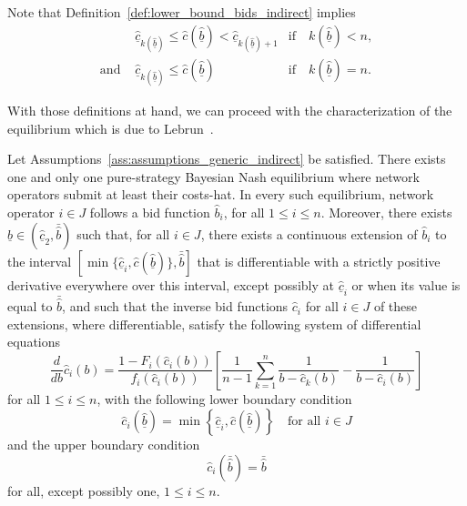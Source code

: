 \noindent Note that Definition~\ref{def:lower_bound_bids_indirect} implies
\begin{equation}
  \label{eq:bounds_lower_bound_bids_cost_indirect}
  \begin{array}{lll}
    &\underline{\hat{c}}_{k(\underline{\hat{b}})} \leq \hat{c}(\underline{\hat{b}}) < \underline{\hat{c}}_{k(\underline{\hat{b}})+1} &\textrm{if}\quad k(\underline{\hat{b}}) < n,\\
    \textrm{and } 
    &\underline{\hat{c}}_{k(\underline{\hat{b}})} \leq \hat{c}(\underline{\hat{b}}) &\textrm{if}\quad k(\underline{\hat{b}}) = n.
  \end{array}
\end{equation}

With those definitions at hand, we can proceed with the characterization of the equilibrium which is due to Lebrun~\cite{Lebrun2006}.
\begin{proposition}
\label{prop:characterization_of_the_equilibrium_indirect}
Let Assumptions~\ref{ass:assumptions_generic_indirect} be satisfied. There exists one and only one pure-strategy Bayesian Nash equilibrium where network operators submit at least their costs-hat. In every such equilibrium, network operator $i\in J$ follows a bid function $\hat{b}_i$, for all $1\leq i\leq n$. Moreover, there exists $\underline{\hat{b}}\in (\underline{\hat{c}}_2, \bar{\hat{b}})$ such that, for all $i\in J$, there exists a continuous extension of $\hat{b}_i$ to the interval $\left[\min\{\underline{\hat{c}}_i, \hat{c}(\underline{\hat{b}})\}, \bar{\hat{b}}\right]$ that is differentiable with a strictly positive derivative everywhere over this interval, except possibly at $\underline{\hat{c}}_i$ or when its value is equal to $\bar{\hat{b}}$, and such that the inverse bid functions $\hat{c}_i$ for all $i\in J$ of these extensions, where differentiable, satisfy the following system of differential equations
\begin{equation}
  \label{eq:foc_ode_indirect}
  \frac{d}{db}\hat{c}_i(b) = \frac{1 - F_i(\hat{c}_i(b))}{f_i(\hat{c}_i(b))}\left[ \frac{1}{n-1}\sum_{k=1}^n \frac{1}{b-\hat{c}_k(b)} - \frac{1}{b-\hat{c}_i(b)} \right]
\end{equation}
for all $1\leq i\leq n$, with the following lower boundary condition
\begin{equation}
  \label{eq:foc_ode_lower_boundary_indirect}
  \hat{c}_i(\underline{\hat{b}}) = \min\left\{\underline{\hat{c}}_i, \hat{c}(\underline{\hat{b}})\right\} \quad\textrm{for all }i\in J
\end{equation}
and the upper boundary condition
\begin{equation}
  \label{eq:foc_ode_upper_boundary_indirect}
  \hat{c}_i(\bar{\hat{b}}) = \bar{\hat{b}}
\end{equation}
for all, except possibly one, $1\leq i\leq n$.
\end{proposition}
